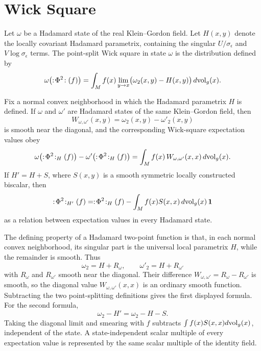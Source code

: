 \section{Wick Square}

\begin{definition}
\label{def:wick-square-point-splitting}
Let \(\omega\) be a Hadamard state of the real Klein--Gordon field.  Let
\(H(x,y)\) denote the locally covariant Hadamard parametrix, containing the
singular \(U/\sigma_\epsilon\) and \(V\log\sigma_\epsilon\) terms.  The
point-split Wick square in state \(\omega\) is the distribution defined by
\[
  \omega\bigl(:\!\Phi^2\!:(f)\bigr)
  =
  \int_M f(x)
  \lim_{y\to x}
  \bigl(\omega_2(x,y)-H(x,y)\bigr)\,d{\rm vol}_g(x).
\]
\end{definition}

\begin{remark}
\label{rem:point-splitting-smooth-change}
Fix a normal convex neighborhood in which the Hadamard parametrix \(H\) is
defined.  If \(\omega\) and \(\omega'\) are Hadamard states of the same
Klein--Gordon field, then
\[
  W_{\omega,\omega'}(x,y)
  =
  \omega_2(x,y)-\omega'_2(x,y)
\]
is smooth near the diagonal, and the corresponding Wick-square expectation
values obey
\[
  \omega\bigl(:\!\Phi^2\!:_H(f)\bigr)
  -
  \omega'\bigl(:\!\Phi^2\!:_H(f)\bigr)
  =
  \int_M f(x)\,W_{\omega,\omega'}(x,x)\,d{\rm vol}_g(x).
\]
If \(H'=H+S\), where \(S(x,y)\) is a smooth symmetric locally constructed
biscalar, then
\[
  :\!\Phi^2\!:_{H'}(f)
  =
  :\!\Phi^2\!:_{H}(f)
  -
  \int_M f(x)S(x,x)\,d{\rm vol}_g(x)\,\mathbf 1
\]
as a relation between expectation values in every Hadamard state.
\end{remark}

The defining property of a Hadamard two-point function is that, in each
normal convex neighborhood, its singular part is the universal local
parametrix \(H\), while the remainder is smooth.  Thus
\[
  \omega_2=H+R_\omega,\qquad
  \omega'_2=H+R_{\omega'}
\]
with \(R_\omega\) and \(R_{\omega'}\) smooth near the diagonal.  Their
difference \(W_{\omega,\omega'}=R_\omega-R_{\omega'}\) is smooth, so the
diagonal value \(W_{\omega,\omega'}(x,x)\) is an ordinary smooth function.
Subtracting the two point-splitting definitions gives the first displayed
formula.  For the second formula,
\[
  \omega_2-H'=\omega_2-H-S .
\]
Taking the diagonal limit and smearing with \(f\) subtracts
\(\int f(x)S(x,x)d{\rm vol}_g(x)\), independent of the state.  A
state-independent scalar multiple of every expectation value is represented
by the same scalar multiple of the identity field.


